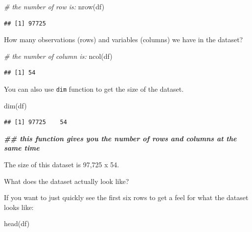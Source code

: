 \documentclass[
]{article}
\newenvironment{Shaded}{\begin{snugshade}}{\end{snugshade}}
\newcommand{\CommentTok}[1]{\textcolor[rgb]{0.56,0.35,0.01}{\textit{#1}}}
\newcommand{\DocumentationTok}[1]{\textcolor[rgb]{0.56,0.35,0.01}{\textbf{\textit{#1}}}}
\newcommand{\FunctionTok}[1]{\textcolor[rgb]{0.00,0.00,0.00}{#1}}
\newcommand{\NormalTok}[1]{#1}
\begin{document}
\begin{Shaded}
\begin{Highlighting}[]
\CommentTok{\# the number of row is:}
\FunctionTok{nrow}\NormalTok{(df)}
\end{Highlighting}
\end{Shaded}

\begin{verbatim}
## [1] 97725
\end{verbatim}

How many observations (rows) and variables (columns) we have in the
dataset?

\begin{Shaded}
\begin{Highlighting}[]
\CommentTok{\# the number of column is:}
\FunctionTok{ncol}\NormalTok{(df)}
\end{Highlighting}
\end{Shaded}

\begin{verbatim}
## [1] 54
\end{verbatim}

You can also use \texttt{dim} function to get the size of the dataset.

\begin{Shaded}
\begin{Highlighting}[]
\FunctionTok{dim}\NormalTok{(df) }
\end{Highlighting}
\end{Shaded}

\begin{verbatim}
## [1] 97725    54
\end{verbatim}

\begin{Shaded}
\begin{Highlighting}[]
\DocumentationTok{\#\# this function gives you the number of rows and columns at the same time}
\end{Highlighting}
\end{Shaded}

The size of this dataset is 97,725 x 54.

What does the dataset actually look like?

If you want to just quickly see the first six rows to get a feel for
what the dataset looks like:

\begin{Shaded}
\begin{Highlighting}[]
\FunctionTok{head}\NormalTok{(df)}
\end{Highlighting}
\end{Shaded}
\end{document}
